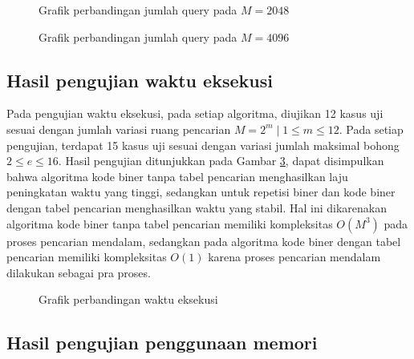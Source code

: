 \begin{figure}
\centering
{}
\caption{Grafik perbandingan jumlah query pada $M=2048$}
\label{fig:graph_query11}
\end{figure}

\begin{figure}
\centering
{}
\caption{Grafik perbandingan jumlah query pada $M=4096$}
\label{fig:graph_query12}
\end{figure}

\subsection{Hasil pengujian waktu eksekusi}

Pada pengujian waktu eksekusi, pada setiap algoritma, diujikan 12 kasus uji sesuai dengan jumlah variasi ruang pencarian $M = 2^m \mid 1 \leq m \leq 12$. Pada setiap pengujian, terdapat 15 kasus uji sesuai dengan variasi jumlah maksimal bohong $2 \leq e \leq 16$. Hasil pengujian ditunjukkan pada Gambar \ref{fig:graph_time}, dapat disimpulkan bahwa algoritma kode biner tanpa tabel pencarian menghasilkan laju peningkatan waktu yang tinggi, sedangkan untuk repetisi biner dan kode biner dengan tabel pencarian menghasilkan waktu yang stabil. Hal ini dikarenakan algoritma kode biner tanpa tabel pencarian memiliki kompleksitas $O(M^3)$ pada proses pencarian mendalam, sedangkan pada algoritma kode biner dengan tabel pencarian memiliki kompleksitas $O(1)$ karena proses pencarian mendalam dilakukan sebagai pra proses.

\begin{figure}
\centering
{}
\caption{Grafik perbandingan waktu eksekusi}
\label{fig:graph_time}
\end{figure}

\subsection{Hasil pengujian penggunaan memori}

